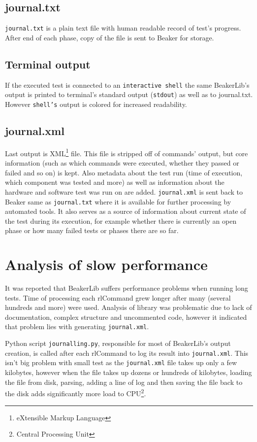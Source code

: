 \subsection{journal.txt}
\texttt{journal.txt} is a plain text file with human readable record of test's progress. After end of each phase, copy of the file is sent to Beaker for storage.
\subsection{Terminal output}
If the executed test is connected to an \texttt{interactive shell} the same BeakerLib's output is printed to terminal's standard output (\texttt{stdout}) as well as to journal.txt. However \texttt{shell's} output is colored for increased readability.  

\subsection{journal.xml}
Last output is XML\footnote{eXtensible Markup Language} file. This file is stripped off of commands' output, but core information (such as which commands were executed, whether they passed or failed and so on) is kept. Also metadata about the test run (time of execution, which component was tested and more) as well as information about the hardware and software test was run on are added. \texttt{journal.xml} is sent back to Beaker same as \texttt{journal.txt} where it is available for further processing by automated tools. It also serves as a source of information about current state of the test during its execution, for example whether there is currently an open phase or how many failed tests or phases there are so far.


\section{Analysis of slow performance}
It was reported that BeakerLib suffers performance problems when running long tests. Time of processing each rlCommand grew longer after many (several hundreds and more) were used. Analysis of library was problematic due to lack of documentation, complex structure and uncommented code, however it indicated that problem lies with generating \texttt{journal.xml}. 

Python script \texttt{journalling.py}, responsible for most of BeakerLib's output creation, is called after each rlCommand to log its result into \texttt{journal.xml}. This isn't big problem with small test as the \texttt{journal.xml} file takes up only a few kilobytes, however when the file takes up dozens or hundreds of kilobytes, loading the file from disk, parsing, adding a line of log and then saving the file back to the disk adds significantly more load to CPU\footnote{Central Processing Unit}. 

